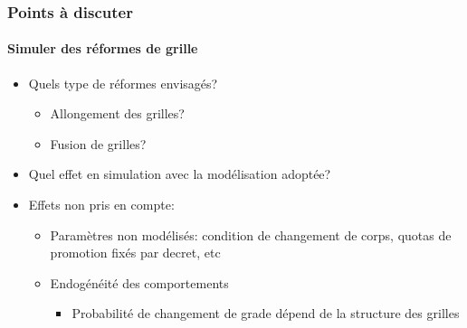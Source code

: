 \documentclass[xcolor=table,ignorenonframetext,12pt]{beamer}
\newenvironment{choixmarges}[2]{\begin{list}{}{%
\setlength{\topsep}{0pt}%
\setlength{\leftmargin}{0pt}%
\setlength{\rightmargin}{0pt}%
\setlength{\listparindent}{\parindent}%
\setlength{\itemindent}{\parindent}%
\setlength{\parsep}{0pt plus 1pt}%
\addtolength{\leftmargin}{#1}%
\addtolength{\rightmargin}{#2}%
}\item }{\end{list}}
\begin{document}
\begin{frame}
\frametitle{Points à discuter}
\framesubtitle{Simuler des réformes de grille}

\begin{choixmarges}{-0.5cm}{-0.5cm}


\begin{itemize}

\item Quels type de réformes envisagés?
	\begin{itemize}
	\item Allongement des grilles?
	\item Fusion de grilles? 
	\end{itemize}
	
\vspace{0.2cm}
\item Quel effet en simulation avec la modélisation adoptée? 

\vspace{0.2cm}
\item Effets non pris en compte:
	\begin{itemize}
	\item Paramètres non modélisés: condition de changement de corps, quotas de promotion fixés par decret, etc
	\item Endogénéité des comportements 
	\begin{itemize}
	\item Probabilité de changement de grade dépend de la structure des grilles
	\end{itemize}
	\end{itemize}

\end{itemize}


\end{choixmarges}
\end{frame}
\end{document}
